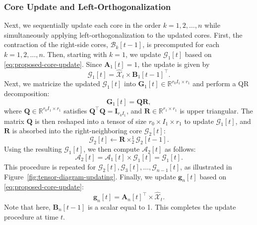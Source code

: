 \documentclass[a4paper, 11pt]{article}
\newcommand{\ttimes}[2]{\times_{#1}^{#2}}
\theoremstyle{plain}
\theoremstyle{definition}
\theoremstyle{remark}
\begin{document}
\subsubsection{Core Update and Left-Orthogonalization}
Next, we sequentially update each core in the order $k=1, 2, \ldots, n$ while simultaneously applying left-orthogonalization to the updated cores.
First, the contraction of the right-side cores, $\mathcal{B}_k[t-1]$, is precomputed for each $k=1, 2, \ldots, n$.
Then, starting with $k=1$, we update $\mathcal{G}_1[t]$ based on \eqref{eq:proposed-core-update}.
Since $\mathbf{A}_1[t] = 1$, the update is given by
\begin{equation*}
    \mathcal{G}_1[t] = \widehat{\mathcal{X}}_t \times \mathbf{B}_1[t-1]^\top.
\end{equation*}
Next, we matricize the updated $\mathcal{G}_1[t]$ into $\mathbf{G}_1[t] \in \mathbb{R}^{r_0 I_1 \times r_1}$ and perform a QR decomposition:
\begin{equation*}
    \mathbf{G}_1[t] = \mathbf{Q} \mathbf{R},
\end{equation*}
where $\mathbf{Q} \in \mathbb{R}^{r_0 I_1 \times r_1}$ satisfies $\mathbf{Q}^\top \mathbf{Q} = \mathbf{I}_{r_0 I_1}$, and $\mathbf{R} \in \mathbb{R}^{r_1 \times r_1}$ is upper triangular.
The matrix $\mathbf{Q}$ is then reshaped into a tensor of size $r_0 \times I_1 \times r_1$ to update $\mathcal{G}_1[t]$, and $\mathbf{R}$ is absorbed into the right-neighboring core $\mathcal{G}_2[t]$:
\begin{equation*}
    \mathcal{G}_2[t] \leftarrow \mathbf{R} \ttimes{2}{1} \mathcal{G}_2[t-1].
\end{equation*}
Using the resulting $\mathcal{G}_1[t]$, we then compute $\mathcal{A}_2[t]$ as follows:
\begin{equation*}
    \mathcal{A}_2[t] = \mathcal{A}_1[t] \times \mathcal{G}_1[t] = \mathcal{G}_1[t].
\end{equation*}
This procedure is repeated for $\mathcal{G}_2[t], \mathcal{G}_3[t], \ldots, \mathcal{G}_{n-1}[t]$, as illustrated in Figure~\ref{fig:tensor-diagram-updating}.
Finally, we update $\bm{g}_n[t]$ based on \eqref{eq:proposed-core-update}:
\begin{equation*}
    \bm{g}_n[t] = \mathbf{A}_n[t]^\top \times \widehat{\mathcal{X}}_t.
\end{equation*}
Note that here, $\mathbf{B}_n[t-1]$ is a scalar equal to 1.
This completes the update procedure at time $t$.
\end{document}
